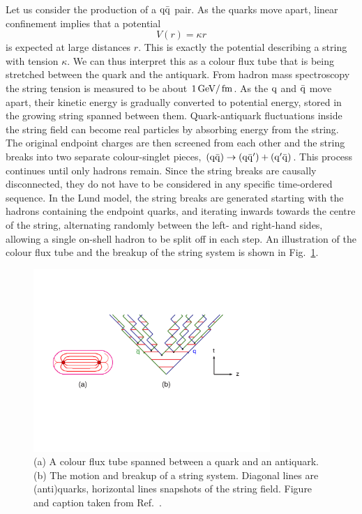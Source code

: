 Let us consider the production of a $\mathrm{q}\bar{\mathrm{q}}$ pair. As the quarks move apart,
linear confinement implies that a potential
\begin{equation}
  V(r) = \kappa r
\end{equation}
is expected at large distances $r$.  This is exactly the potential describing a
string with tension $\kappa$. We can thus interpret this as a colour flux tube that is being
stretched
between the quark and the antiquark. From hadron mass spectroscopy the string tension is
measured to be about $1\,\text{Ge\hspace{-.08em}V}/\text{\,fm}$.
As the $\mathrm{q}$ and $\bar{\mathrm{q}}$ move apart, their kinetic energy is gradually converted to potential
energy, stored in the growing string spanned between them. 
Quark-antiquark fluctuations inside the string field can become real particles by absorbing energy
from the string. The original endpoint charges are then screened from each other and the
string breaks into two separate colour-singlet pieces, $(\mathrm{q} \bar{\mathrm{q}}) \rightarrow (\mathrm{q}
\bar{\mathrm{q}}') + (\mathrm{q}' \bar{\mathrm{q}})$. This process continues until only hadrons remain.
Since the string breaks are causally disconnected, they do not have to be considered in any
specific time-ordered sequence. In the Lund model, the string breaks are generated starting
with the hadrons containing the endpoint quarks, and iterating inwards towards the centre of the
string, alternating randomly between the left- and right-hand sides, allowing a single on-shell
hadron to be split off in each step. An illustration of the colour flux tube and the breakup of the
string system is shown in Fig.~\ref{fig:hadronization_string}.

\begin{figure}[tpb]
  \centering
  \includegraphics[width=0.8\textwidth]{figures/eventreco_generation/stringone}
  \caption{ (a) A colour flux tube spanned between a quark and an antiquark. (b) The motion
and breakup of a string system. Diagonal lines are (anti)quarks, horizontal lines snapshots of
the string field. Figure and caption taken from Ref.~\cite{Buckley:2011ms}.
  \label{fig:hadronization_string}}
\end{figure}


